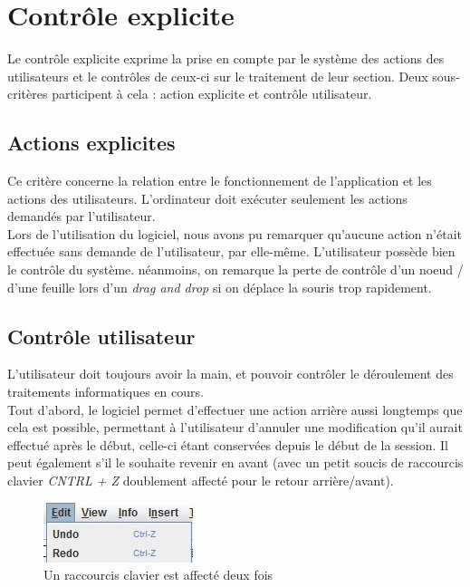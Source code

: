 \documentclass[12pt, a4paper]{article}
\begin{document}
\section{Contrôle explicite}
Le contrôle explicite exprime la prise en compte par le système des actions des utilisateurs et le contrôles de ceux-ci sur le traitement de leur section. Deux sous-critères participent à cela : action explicite et contrôle utilisateur.
\subsection{Actions explicites}
Ce critère concerne la relation entre le fonctionnement de l'application et les actions des utilisateurs. L'ordinateur doit exécuter seulement les actions demandés par l'utilisateur.\\


Lors de l'utilisation du logiciel, nous avons pu remarquer qu'aucune action n'était effectuée sans demande de l'utilisateur, par elle-même. L'utilisateur possède bien le contrôle du système. néanmoins, on remarque la perte de contrôle d'un noeud / d'une feuille lors d'un \emph{drag and drop} si on déplace la souris trop rapidement.

\subsection{Contrôle utilisateur}
L'utilisateur doit toujours avoir la main, et pouvoir contrôler le déroulement des traitements informatiques en cours. \\


Tout d'abord, le logiciel permet d'effectuer une action arrière aussi longtemps que cela est possible, permettant à l'utilisateur d'annuler une modification qu'il aurait effectué après le début, celle-ci étant conservées depuis le début de la session. Il peut également s'il le souhaite revenir en avant (avec un petit soucis de raccourcis clavier \emph{CNTRL + Z} doublement affecté pour le retour arrière/avant).

\begin{figure}[h]
\begin{center}
   \includegraphics[scale = 0.8]{ctrlz.jpg}
	\caption{Un raccourcis clavier est affecté deux fois}
	\end{center}
\end{figure}
\end{document}
